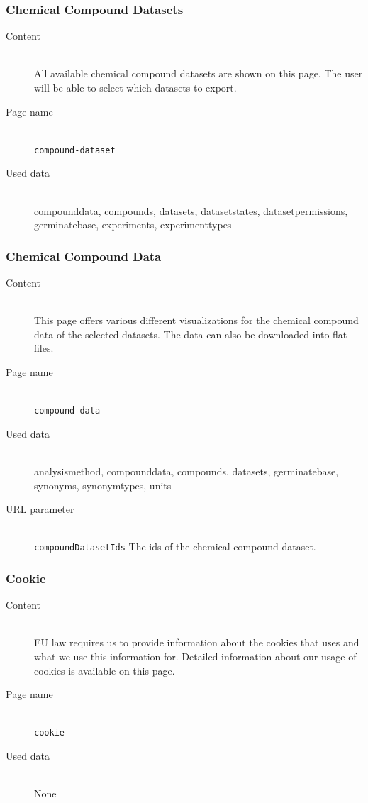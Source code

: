 \subsubsection{Chemical Compound Datasets}
\begin{description}
	\item[Content]\hfill\\All available chemical compound datasets are shown on this page. The user will be able to select which datasets to export.
	\item[Page name]\hfill\\\texttt{compound-dataset}
	\item[Used data]\hfill\\compounddata, compounds, datasets, datasetstates, datasetpermissions, germinatebase, experiments, experimenttypes
\end{description}

\subsubsection{Chemical Compound Data}
\begin{description}
	\item[Content]\hfill\\This page offers various different visualizations for the chemical compound data of the selected datasets. The data can also be downloaded into flat files.
	\item[Page name]\hfill\\\texttt{compound-data}
	\item[Used data]\hfill\\analysismethod, compounddata, compounds, datasets, germinatebase, synonyms, synonymtypes, units
	\item[URL parameter]\hfill\\\texttt{compoundDatasetIds} The ids of the chemical compound dataset.
\end{description}

\subsubsection{Cookie}
\begin{description}
	\item[Content]\hfill\\EU law requires us to provide information about the cookies that {\germinate} uses and what we use this information for. Detailed information about our usage of cookies is available on this page.
	\item[Page name]\hfill\\\texttt{cookie}
	\item[Used data]\hfill\\None
\end{description}

